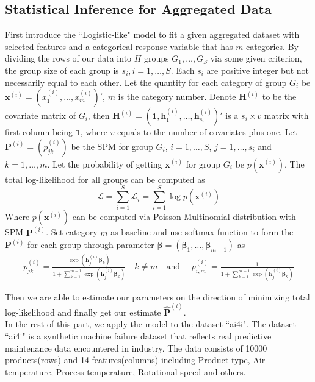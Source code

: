\documentclass[12pt]{article}
\newcommand{\loglik}{\mathcal{L}}
\newcommand{\Pmat}{\mathbf{P}}
\newcommand{\wh}{\widehat}
\begin{document}
\subsection{Statistical Inference for Aggregated Data}\label{sec:model.est.inf}	
First introduce the ``Logistic-like" model to fit a given aggregated dataset with selected features and a categorical response variable that has $m$ categories.
By dividing the rows of our data into $H$ groups $G_1,\dots,G_{S}$ via some given criterion, the group size of each group is $s_i,i=1,\dots,S$. Each $s_i$ are positive integer but not necessarily equal to each other. Let the quantity for each category of group $G_i$ be $\boldsymbol{x}^{(i)} = (x_1^{(i)}, \dots, x_m^{(i)})'$, $m$ is the category number. Denote $\boldsymbol{H}^{(i)}$ to be the covariate matrix of $G_i$, then $\boldsymbol{H}^{(i)} = (\boldsymbol{1}, \boldsymbol{h}_{1}^{(i)},\dots,\boldsymbol{h}_{s_i}^{(i)})'$ is a $s_i \times v$ matrix with first column being $\boldsymbol{1}$, where $v$ equals to the number of covariates plus one. Let $\Pmat^{(i)} = (p_{jk}^{(i)})$ be the SPM for group $G_i$, $i = 1, \dots, S$, $j = 1,\dots ,s_i$ and $k = 1,\dots, m$. Let the probability of getting $\boldsymbol{x}^{(i)}$ for group $G_i$ be $p(\boldsymbol{x}^{(i)})$. The total log-likelihood for all groups can be computed as
\begin{equation*}
\loglik = \sum_{i=1}^{S}\loglik_i = \sum_{i=1}^{S}\log p(\boldsymbol{x}^{(i)})
\end{equation*}
Where $p(\boldsymbol{x}^{(i)})$ can be computed via Poisson Multinomial distribution with SPM $\Pmat^{(i)}$. Set category $m$ as baseline and use softmax function to form the $\Pmat^{(i)}$ for each group through parameter $\boldsymbol{\beta} = (\boldsymbol{\beta}_1, \dots, \boldsymbol{\beta}_{m-1})$ as
\begin{align*}
    p_{j k}^{(i)} = \frac{\exp{\left(\boldsymbol{h}_{j}^{(i)} \boldsymbol{\beta}_{k}\right)}}{1 + \sum_{k=1}^{m-1}\exp{\left( \boldsymbol{h}_{j}^{(i)} \boldsymbol{\beta}_{k} \right)}}
    \quad k \neq m \quad \text{and } \quad
    p_{i,m}^{(i)} = \frac{1}{1 + \sum_{k=1}^{m-1}\exp{\left( \boldsymbol{h}_{j}^{(i)} \boldsymbol{\beta}_{k} \right)}}
\end{align*}

Then we are able to estimate our parameters on the direction of minimizing total log-likelihood and finally get our estimate $\wh{\Pmat}^{(i)}$. \\
In the rest of this part, we apply the model to the dataset ``ai4i". The dataset ``ai4i" is a synthetic machine failure dataset that reflects real predictive maintenance data encountered in industry. The data consists of 10000 products(rows) and 14 features(columns) including Product type, Air temperature, Process temperature, Rotational speed and others.
\end{document}
